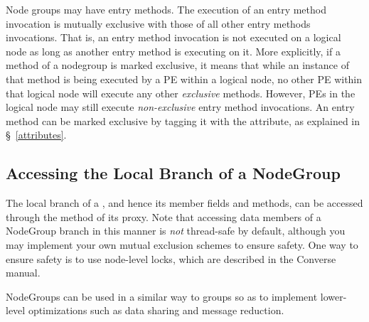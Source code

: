 Node groups may have  entry methods.  The execution of an 
entry method invocation is mutually exclusive with those of all other  entry methods invocations.
That is, an 
entry method invocation is not executed on a logical node as long as another  entry 
method is executing on it.
More explicitly, if a method  of a
nodegroup  is marked exclusive, it means that while an instance of that method is being
executed by a PE within a logical node, no other PE within that
logical node will execute any other {\em exclusive} methods.
However, PEs in the logical node may still 
execute {\em non-exclusive} entry method invocations.
An entry method can be marked exclusive by tagging it with the  attribute,
as explained in \S~\ref{attributes}.


\subsection{Accessing the Local Branch of a NodeGroup}

The local branch of a  , and hence its
member fields and methods, can be accessed through the method  of its proxy. Note that accessing data members of
a NodeGroup branch in this manner is {\em not} thread-safe by default, although
you may implement your own mutual exclusion schemes to ensure safety.
One way to ensure safety is to use node-level locks, which are described in the
Converse manual.

NodeGroups can be used in a similar way to groups so as to implement lower-level
optimizations such as data sharing and message reduction.


